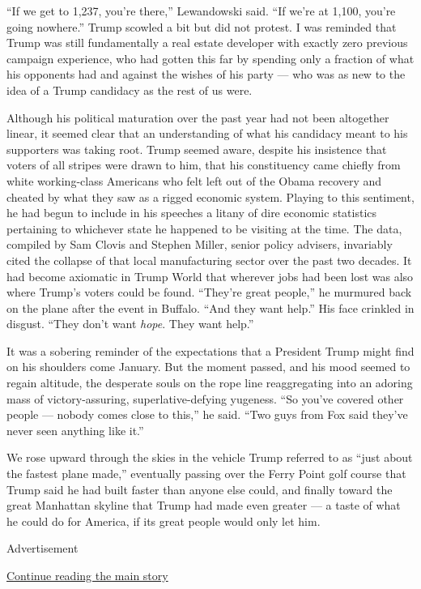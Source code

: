 ``If we get to 1,237, you're there,'' Lewandowski said. ``If we're at
1,100, you're going nowhere.'' Trump scowled a bit but did not protest.
I was reminded that Trump was still fundamentally a real estate
developer with exactly zero previous campaign experience, who had gotten
this far by spending only a fraction of what his opponents had and
against the wishes of his party --- who was as new to the idea of a
Trump candidacy as the rest of us were.

Although his political maturation over the past year had not been
altogether linear, it seemed clear that an understanding of what his
candidacy meant to his supporters was taking root. Trump seemed aware,
despite his insistence that voters of all stripes were drawn to him,
that his constituency came chiefly from white working-class Americans
who felt left out of the Obama recovery and cheated by what they saw as
a rigged economic system. Playing to this sentiment, he had begun to
include in his speeches a litany of dire economic statistics pertaining
to whichever state he happened to be visiting at the time. The data,
compiled by Sam Clovis and Stephen Miller, senior policy advisers,
invariably cited the collapse of that local manufacturing sector over
the past two decades. It had become axiomatic in Trump World that
wherever jobs had been lost was also where Trump's voters could be
found. ``They're great people,'' he murmured back on the plane after the
event in Buffalo. ``And they want help.'' His face crinkled in disgust.
``They don't want \emph{hope}. They want help.''

It was a sobering reminder of the expectations that a President Trump
might find on his shoulders come January. But the moment passed, and his
mood seemed to regain altitude, the desperate souls on the rope line
reaggregating into an adoring mass of victory-assuring,
superlative-defying yugeness. ``So you've covered other people ---
nobody comes close to this,'' he said. ``Two guys from Fox said they've
never seen anything like it.''

We rose upward through the skies in the vehicle Trump referred to as
``just about the fastest plane made,'' eventually passing over the Ferry
Point golf course that Trump said he had built faster than anyone else
could, and finally toward the great Manhattan skyline that Trump had
made even greater --- a taste of what he could do for America, if its
great people would only let him.

Advertisement

\protect\hyperlink{after-bottom}{Continue reading the main story}

